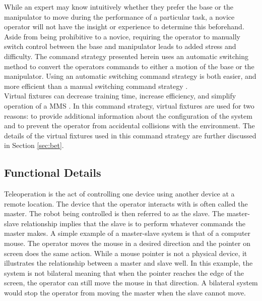 \documentclass[onecolumn,10pt,final]{asme2ej}
\begin{document}
While an expert may know intuitively whether they prefer the base or the manipulator to move during the performance of a particular task, a novice operator will not have the insight or experience to determine this beforehand. Aside from being prohibitive to a novice, requiring the operator to manually switch control between the base and manipulator leads to added stress and difficulty. The command strategy presented herein uses an automatic switching method to convert the operators commands to either a motion of the base or the manipulator. Using an automatic switching command strategy is both easier, and more efficient than a manual switching command strategy \cite{w1}.\\

Virtual fixtures can decrease training time, increase efficiency, and simplify operation of a MMS \cite{w4}. In this command strategy, virtual fixtures are used for two reasons: to provide additional information about the configuration of the system and to prevent the operator from accidental collisions with the environment. The details of the virtual fixtures used in this command strategy are further discussed in Section \ref{sec:bet}.\\

\subsection{Functional Details}
\label{sec:deets}
Teleoperation is the act of controlling one device using another device at a remote location. The device that the operator interacts with is often called the master. The robot being controlled is then referred to as the slave. The master-slave relationship implies that the slave is to perform whatever commands the master makes. A simple example of a master-slave system is that of a computer mouse. The operator moves the mouse in a desired direction and the pointer on screen does the same action. While a mouse pointer is not a physical device, it illustrates the relationship between a master and slave well. In this example, the system is not bilateral meaning that when the pointer reaches the edge of the screen, the operator can still move the mouse in that direction. A bilateral system would stop the operator from moving the master when the slave cannot move.\\
\end{document}
